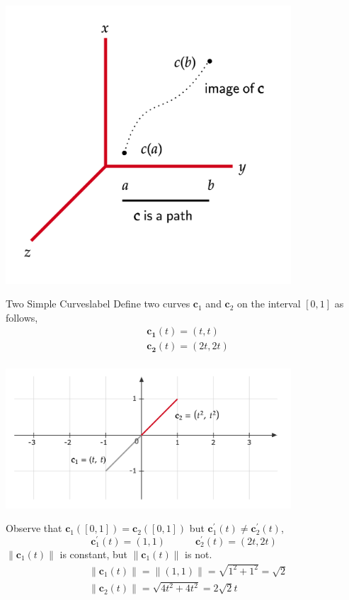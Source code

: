 \begin{marginfigure}
\begin{center}
\includegraphics[width=0.8\textwidth]{figures/wk-2/fig-27.png}
\end{center}
\end{marginfigure}

\begin{ex}{Two Simple Curves}{label}
    Define two curves $\mathbf{c}_1$ and $\mathbf{c}_2$ on the interval $[0, 1]$ as follows,
    \begin{align*}
        &\mathbf{c_1}(t)=(t, t) \\
        &\mathbf{c_2}(t)=(2t, 2t) \\
    \end{align*}
    \begin{center}
    \includegraphics[width=0.8\textwidth]{figures/wk-2/fig-28.png}
    \end{center}
    Observe that $\mathbf{c}_1([0,1])=\mathbf{c}_2([0,1])$ but $\mathbf{c}^{\prime}_1(t) \neq \mathbf{c}^{\prime}_2(t)$,
    \[\mathbf{c}_1^{\prime}(t)=(1,1) \quad \quad \quad \mathbf{c}_2^{\prime}(t)=(2 t, 2 t)\]
    $\left\|\mathbf{c}_1(t)\right\|$ is constant, but $\left\|\mathbf{c}_1(t)\right\|$ is not.
    \begin{align*}
        &\left\|\mathbf{c}_1(t)\right\|=\|(1,1)\|=\sqrt{1^2+1^2}=\sqrt{2} \\
        &\left\|\mathbf{c}_2(t)\right\|=\sqrt{4 t^2+4 t^2}=2 \sqrt{2} t
    \end{align*}
\end{ex}

